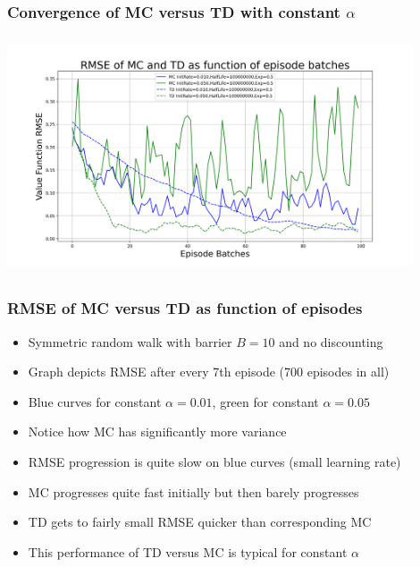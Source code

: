 \documentclass[handout]{beamer}
\begin{document}
\begin{frame}
\frametitle{Convergence of MC versus TD with constant $\alpha$}
\includegraphics[width=12cm, height=7cm]{random_walk_mrp_convergence.png}
\end{frame}

\begin{frame}
\frametitle{RMSE of MC versus TD as function of episodes}
\pause
\begin{itemize}[<+->]
\item Symmetric random walk with barrier $B=10$ and no discounting
\item Graph depicts RMSE after every 7th episode (700 episodes in all)
\item Blue curves for constant $\alpha = 0.01$, green for constant $\alpha = 0.05$
\item Notice how MC has significantly more variance
\item RMSE progression is quite slow on blue curves (small learning rate)
\item MC progresses quite fast initially but then barely progresses
\item TD gets to fairly small RMSE quicker than corresponding MC
\item This performance of TD versus MC is typical for constant $\alpha$
\end{itemize}
\end{frame}
\end{document}
